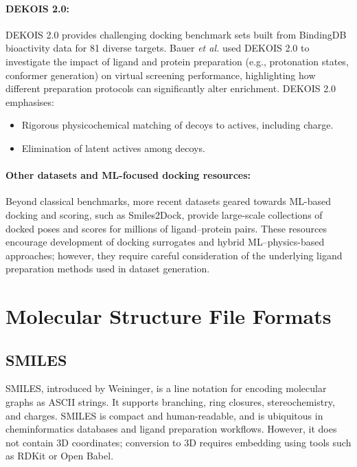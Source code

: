 \documentclass[12pt]{article}
\begin{document}
\paragraph{DEKOIS 2.0:}

DEKOIS 2.0\cite{CH6_DEKOIS2} provides challenging docking benchmark sets built from BindingDB\cite{CH6_chen2001bindingdb} bioactivity data for 81 diverse targets. Bauer \emph{et al.}\cite{CH6_DEKOIS2,CH6_IbrahimDEKOIS}  used DEKOIS 2.0 to investigate the impact of ligand and protein preparation (e.g., protonation states, conformer generation) on virtual screening performance, highlighting how different preparation protocols can significantly alter enrichment.
DEKOIS 2.0 emphasises:
\begin{itemize}
  \item Rigorous physicochemical matching of decoys to actives, including charge.
  \item Elimination of latent actives among decoys.
\end{itemize}



\paragraph{Other datasets and ML-focused docking resources:}

Beyond classical benchmarks, more recent datasets geared towards ML-based docking and scoring, such as Smiles2Dock\cite{CH6_Smiles2Dock}, provide large-scale collections of docked poses and scores for millions of ligand–protein pairs. These resources encourage development of docking surrogates and hybrid ML--physics-based approaches; however, they require careful consideration of the underlying ligand preparation methods used in dataset generation.

\section{Molecular Structure File Formats}

\subsection{SMILES}

SMILES, introduced by Weininger\cite{CH6_Weininger1988,CH6_weininger1989smiles,CH6_weininger1990smiles}, is a line notation for encoding molecular graphs as ASCII strings. It supports branching, ring closures, stereochemistry, and charges. SMILES is compact and human-readable, and is ubiquitous in cheminformatics databases and ligand preparation workflows. However, it does not contain 3D coordinates; conversion to 3D requires embedding using tools such as RDKit or Open Babel.
\end{document}
